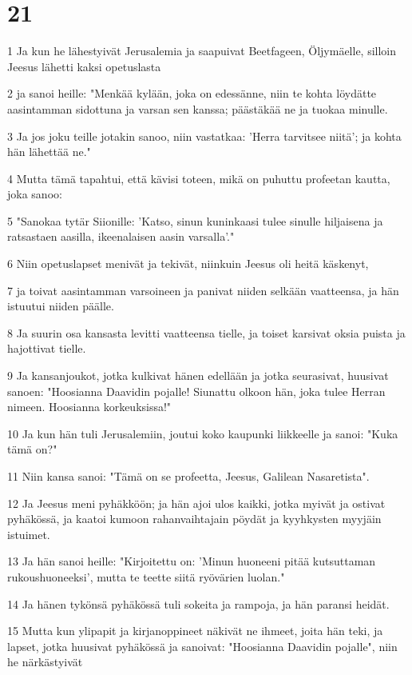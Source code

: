 \chapter{21}

\par 1 Ja kun he lähestyivät Jerusalemia ja saapuivat Beetfageen, Öljymäelle, silloin Jeesus lähetti kaksi opetuslasta
\par 2 ja sanoi heille: "Menkää kylään, joka on edessänne, niin te kohta löydätte aasintamman sidottuna ja varsan sen kanssa; päästäkää ne ja tuokaa minulle.
\par 3 Ja jos joku teille jotakin sanoo, niin vastatkaa: 'Herra tarvitsee niitä'; ja kohta hän lähettää ne."
\par 4 Mutta tämä tapahtui, että kävisi toteen, mikä on puhuttu profeetan kautta, joka sanoo:
\par 5 "Sanokaa tytär Siionille: 'Katso, sinun kuninkaasi tulee sinulle hiljaisena ja ratsastaen aasilla, ikeenalaisen aasin varsalla'."
\par 6 Niin opetuslapset menivät ja tekivät, niinkuin Jeesus oli heitä käskenyt,
\par 7 ja toivat aasintamman varsoineen ja panivat niiden selkään vaatteensa, ja hän istuutui niiden päälle.
\par 8 Ja suurin osa kansasta levitti vaatteensa tielle, ja toiset karsivat oksia puista ja hajottivat tielle.
\par 9 Ja kansanjoukot, jotka kulkivat hänen edellään ja jotka seurasivat, huusivat sanoen: "Hoosianna Daavidin pojalle! Siunattu olkoon hän, joka tulee Herran nimeen. Hoosianna korkeuksissa!"
\par 10 Ja kun hän tuli Jerusalemiin, joutui koko kaupunki liikkeelle ja sanoi: "Kuka tämä on?"
\par 11 Niin kansa sanoi: "Tämä on se profeetta, Jeesus, Galilean Nasaretista".
\par 12 Ja Jeesus meni pyhäkköön; ja hän ajoi ulos kaikki, jotka myivät ja ostivat pyhäkössä, ja kaatoi kumoon rahanvaihtajain pöydät ja kyyhkysten myyjäin istuimet.
\par 13 Ja hän sanoi heille: "Kirjoitettu on: 'Minun huoneeni pitää kutsuttaman rukoushuoneeksi', mutta te teette siitä ryövärien luolan."
\par 14 Ja hänen tykönsä pyhäkössä tuli sokeita ja rampoja, ja hän paransi heidät.
\par 15 Mutta kun ylipapit ja kirjanoppineet näkivät ne ihmeet, joita hän teki, ja lapset, jotka huusivat pyhäkössä ja sanoivat: "Hoosianna Daavidin pojalle", niin he närkästyivät
